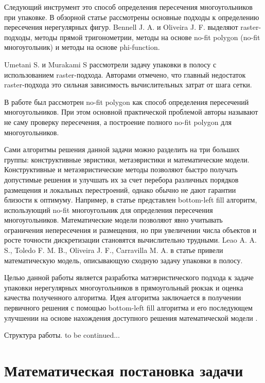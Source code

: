 \documentclass[a4paper]{article}
\begin{document}
    Следующий инструмент это способ определения пересечения многоугольников при упаковке. В обзорной статье \cite{tutorial} рассмотрены основные подходы к определению пересечения нерегулярных фигур. Bennell J. A. и Oliveira J. F. выделяют raster-подходы, методы прямой тригонометрии, методы на основе no-fit polygon (no-fit многоугольник) и методы на основе phi-function. 
    
    Umetani S. и Murakami S \cite{discr strip} рассмотрели задачу упаковки в полосу с использованием raster-подхода. Авторами отмечено, что главный недостаток raster-подхода это сильная зависимость вычислительных затрат от шага сетки. 

    В работе \cite{NFP} был рассмотрен no-fit polygon как способ определения пересечений многоугольников. При этом основной практической проблемой авторы называют не саму проверку пересечения, а построение полного no-fit polygon для многоугольников.

    Сами алгоритмы решения данной задачи можно разделить на три больших группы: конструктивные эвристики, метаэвристики и математические модели. Конструктивные и метаэвристические методы позволяют быстро получать допустимые решения и улучшать их за счет перебора различных порядков размещения и локальных перестроений, однако обычно не дают гарантии близости к оптимуму. Например, в статье \cite{BLF} представлен bottom-left fill алгоритм, использующий no-fit многоугольник для определения пересечения многоугольников. Математические модели позволяют явно учитывать ограничения непересечения и размещения, но при увеличении числа объектов и росте точности дискретизации становятся вычислительно трудными. Leao A. A. S., Toledo F. M. B., Oliveira J. F., Carravilla M. A. в статье \cite{MIP strip} привели математическую модель, описывающую сходную задачу упаковки в полосу.

    Целью данной работы является разработка матэвристического подхода к задаче упаковки нерегулярных многоугольников в прямоугольный рюкзак и оценка качества полученного алгоритма. Идея алгоритма заключается в получении первичного решения с помощью bottom-left fill алгоритма \cite{BLF} и его последующем улучшении на основе нахождения доступного решения математической модели \cite{MIP strip}.

    Структура работы. to be continued...
    
    \newpage
	
	\section{Математическая постановка задачи}
\end{document}
